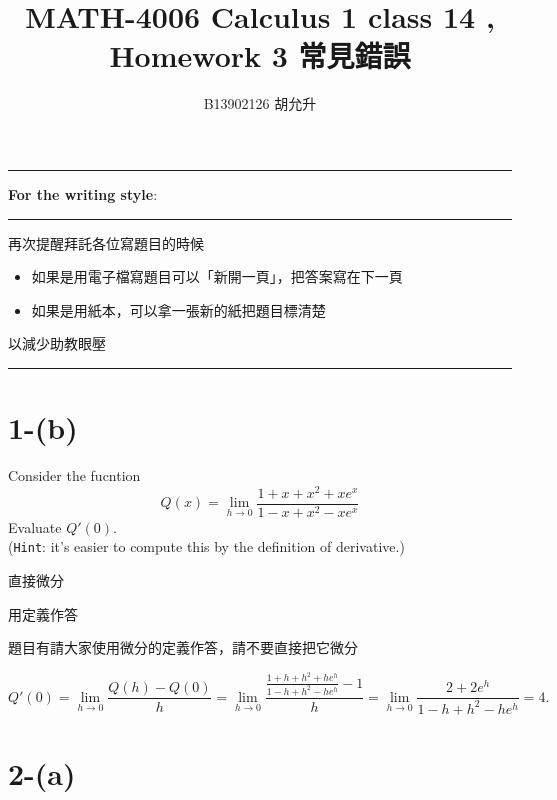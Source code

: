 \documentclass{article}
\title{MATH-4006 Calculus 1 class 14 , Homework 3 常見錯誤}
\author{B13902126 胡允升}
\date{}
\begin{document}
\fontsize{12pt}{16pt}\selectfont

\maketitle  
\noindent\rule{\linewidth}{0.4pt}
\textbf{For the writing style}:

\noindent\rule{\linewidth}{0.4pt}
再次提醒拜託各位寫題目的時候
\begin{itemize}
    \item 如果是用電子檔寫題目可以「新開一頁」，把答案寫在下一頁
    \item 如果是用紙本，可以拿一張新的紙把題目標清楚
\end{itemize}
以減少助教眼壓

\noindent\rule{\linewidth}{0.4pt}

\section{1-(b)}

\begin{problem}
Consider the fucntion
\[
Q(x) = \lim_{h \to 0} \frac{1 + x + x^2 + x e^x}{1 - x + x^2 - x e^x} 
\]
Evaluate $Q'(0).$ \\
(\texttt{Hint}: it's easier to compute this by the definition of derivative.)
\end{problem}
\vspace{-12pt}
\begin{wrong}
	直接微分
\end{wrong}
\vspace{-12pt}
\begin{cor}
用定義作答
\end{cor}

\begin{reason}
題目有請大家使用微分的定義作答，請不要直接把它微分

\[
Q'(0) 
= \lim_{h \to 0} \frac{Q(h) - Q(0)}{h} 
= \lim_{h \to 0} \frac{\frac{1 + h + h^2 + h e^h}{1 - h + h^2 - h e^h} - 1}{h} 
= \lim_{h \to 0} \frac{2 + 2e^h}{1 - h + h^2 - h e^h} 
= 4.
\]

\end{reason}

\newpage

\section{2-(a)}
\end{document}
